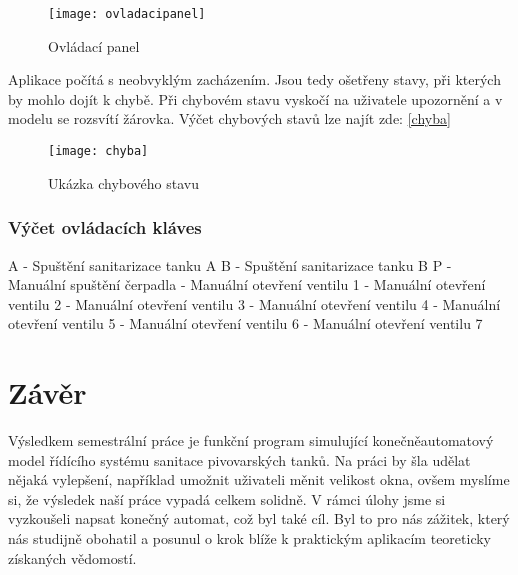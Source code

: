 \documentclass[12pt, a4paper]{article}
\begin{document}
\begin{figure}[h]
\centering 
\texttt{[image: ovladacipanel]}
\caption{Ovládací panel}
\end{figure}
\newpage
Aplikace počítá s neobvyklým zacházením. Jsou tedy ošetřeny stavy, při kterých by mohlo dojít k chybě. Při chybovém stavu vyskočí na uživatele upozornění a v modelu se rozsvítí žárovka. Výčet chybových stavů lze najít zde: \ref{chyba}

\begin{figure}[h]
\centering 
\texttt{[image: chyba]}
\caption{Ukázka chybového stavu}
\end{figure}

\subsubsection{Výčet ovládacích kláves} \label{ovladani}
A - Spuštění sanitarizace tanku A \newline 
B - Spuštění sanitarizace tanku B \newline 
P - Manuální spuštění čerpadla  - Manuální otevření ventilu 1  - Manuální otevření ventilu 2  - Manuální otevření ventilu 3  - Manuální otevření ventilu 4  - Manuální otevření ventilu 5  - Manuální otevření ventilu 6  - Manuální otevření ventilu 7 \newline 

\section{Závěr}
Výsledkem semestrální práce je funkční program simulující konečněautomatový model řídícího systému sanitace pivovarských tanků. Na práci by šla udělat nějaká vylepšení, například umožnit uživateli měnit velikost okna, ovšem myslíme si, že výsledek naší práce vypadá celkem solidně. V rámci úlohy jsme si vyzkoušeli napsat konečný automat, což byl také cíl. Byl to pro nás zážitek, který nás studijně obohatil a posunul o krok blíže k praktickým aplikacím teoreticky získaných vědomostí. 

\nocite{wiki:Konecny_automat}

\listoffigures



\end{document}
